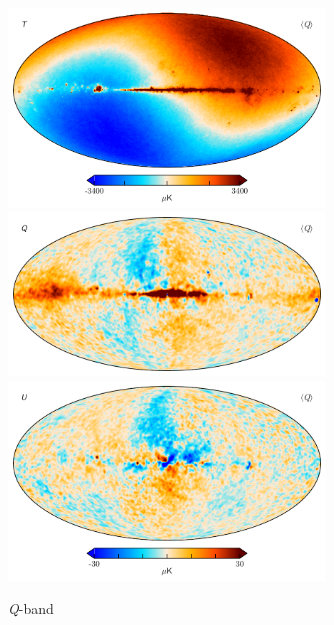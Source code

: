 \documentclass[twocolumn]{../../common/aa}
\newcommand{\Q}[0]{\textit Q}
\begin{document}
\begin{figure}
	\centering
	\includegraphics[width=0.75\textwidth]{figures/Q_mu_I.pdf}
	\includegraphics[width=0.75\textwidth]{figures/Q_mu_Q.pdf}
	\includegraphics[width=0.75\textwidth]{figures/Q_mu_U.pdf}
	\caption{\Q-band}
\end{figure}
\end{document}

